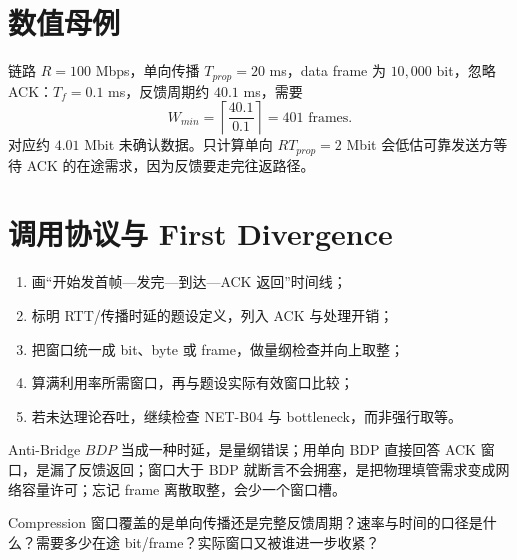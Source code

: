 \documentclass[UTF8,fontset=none,11pt,a4paper]{ctexart}
\begin{document}
\section{数值母例}

链路 $R=100$ Mbps，单向传播 $T_{prop}=20$ ms，data frame 为 $10{,}000$ bit，忽略 ACK：$T_f=0.1$ ms，反馈周期约 $40.1$ ms，需要
\[
W_{min}=\left\lceil\frac{40.1}{0.1}\right\rceil=401\text{ frames}.
\]
对应约 $4.01$ Mbit 未确认数据。只计算单向 $R T_{prop}=2$ Mbit 会低估可靠发送方等待 ACK 的在途需求，因为反馈要走完往返路径。

\section{调用协议与 First Divergence}

\begin{enumerate}
\item 画“开始发首帧—发完—到达—ACK 返回”时间线；
\item 标明 RTT/传播时延的题设定义，列入 ACK 与处理开销；
\item 把窗口统一成 bit、byte 或 frame，做量纲检查并向上取整；
\item 算满利用率所需窗口，再与题设实际有效窗口比较；
\item 若未达理论吞吐，继续检查 NET-B04 与 bottleneck，而非强行取等。
\end{enumerate}

\begin{warnbox}{Anti-Bridge}
$BDP$ 当成一种时延，是量纲错误；用单向 BDP 直接回答 ACK 窗口，是漏了反馈返回；窗口大于 BDP 就断言不会拥塞，是把物理填管需求变成网络容量许可；忘记 frame 离散取整，会少一个窗口槽。
\end{warnbox}

\begin{corebox}{Compression}
窗口覆盖的是单向传播还是完整反馈周期？速率与时间的口径是什么？需要多少在途 bit/frame？实际窗口又被谁进一步收紧？
\end{corebox}
\end{document}

